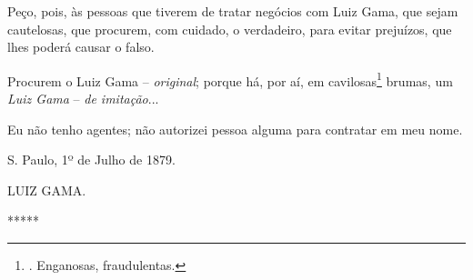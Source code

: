 Peço, pois, às pessoas que tiverem de tratar negócios com Luiz Gama, que
sejam cautelosas, que procurem, com cuidado, o verdadeiro, para evitar
prejuízos, que lhes poderá causar o falso.

Procurem o Luiz Gama -- \emph{original}; porque há, por aí, em
cavilosas\footnote{. Enganosas, fraudulentas.}
bruma\protect\hypertarget{Secao_Sem_Titulo-53}{}{}s, um \emph{Luiz Gama}
-- \emph{de imitação}...

Eu não tenho agentes; não autorizei pessoa alguma para contratar em meu
nome.

S. Paulo, 1º de Julho de 1879.

LUIZ GAMA.

*****

